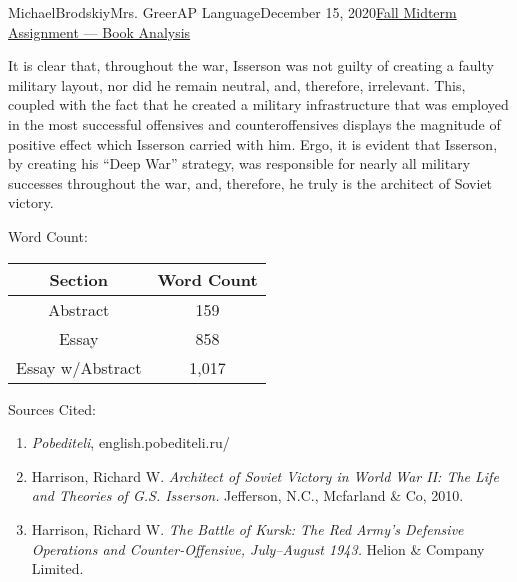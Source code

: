 \documentclass[12pt,letterpaper]{article}
\begin{document}
\begin{mla}{Michael}{Brodskiy}{Mrs. Greer}{AP Language}{December 15, 2020}{\underline{Fall Midterm Assignment — Book Analysis}}
  \begin{justify}
    \vspace{-12pt}\quad It is clear that, throughout the war, Isserson was not guilty of creating a faulty military layout, nor did he remain neutral, and, therefore, irrelevant. This, coupled with the fact that he created a military infrastructure that was employed in the most successful offensives and counteroffensives displays the magnitude of positive effect which Isserson carried with him. Ergo, it is evident that Isserson, by creating his “Deep War” strategy, was responsible for nearly all military successes throughout the war, and, therefore, he truly is the architect of Soviet victory. 
  \end{justify}

  \begin{center}
    Word Count:\\\vspace{10pt}
    \begin{tabular}{| c | c |}
      \hline
      Section & Word Count\\
      \hline
      Abstract & 159\\
      \hline
      Essay & 858 \\
      \hline
      Essay w/Abstract & 1,017\\
     \hline
    \end{tabular}
  \end{center}

  \newpage

  \begin{center}
    Sources Cited:
  \end{center}

  \begin{enumerate}

    \item \textit{Pobediteli}, english.pobediteli.ru/

    \item Harrison, Richard W.\hspace{5pt} \textit{Architect of Soviet Victory in World War II: The Life and Theories of G.S. Isserson.} Jefferson, N.C., Mcfarland \& Co, 2010.

    \item Harrison, Richard W.\hspace{5pt} \textit{The Battle of Kursk: The Red Army's Defensive Operations and Counter-Offensive, July–August 1943.} Helion \& Company Limited.

  \end{enumerate}

\end{mla}
\end{document}
